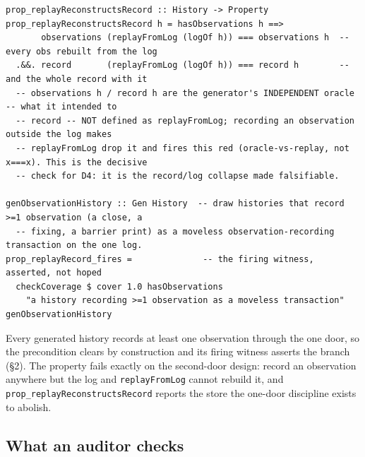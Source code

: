 \begin{lstlisting}
prop_replayReconstructsRecord :: History -> Property
prop_replayReconstructsRecord h = hasObservations h ==>
       observations (replayFromLog (logOf h)) === observations h  -- every obs rebuilt from the log
  .&&. record       (replayFromLog (logOf h)) === record h        -- and the whole record with it
  -- observations h / record h are the generator's INDEPENDENT oracle -- what it intended to
  -- record -- NOT defined as replayFromLog; recording an observation outside the log makes
  -- replayFromLog drop it and fires this red (oracle-vs-replay, not x===x). This is the decisive
  -- check for D4: it is the record/log collapse made falsifiable.

genObservationHistory :: Gen History  -- draw histories that record >=1 observation (a close, a
  -- fixing, a barrier print) as a moveless observation-recording transaction on the one log.
prop_replayRecord_fires =              -- the firing witness, asserted, not hoped
  checkCoverage $ cover 1.0 hasObservations
    "a history recording >=1 observation as a moveless transaction" genObservationHistory
\end{lstlisting}

Every generated history records at least one observation through the one door, so the precondition
clears by construction and its firing witness asserts the branch (\S 2). The property fails exactly
on the second-door design: record an observation
anywhere but the log and \texttt{replayFromLog} cannot rebuild it, and
\texttt{prop\_replayReconstructsRecord} reports the store the one-door discipline exists to abolish.

\subsection{What an auditor checks}

